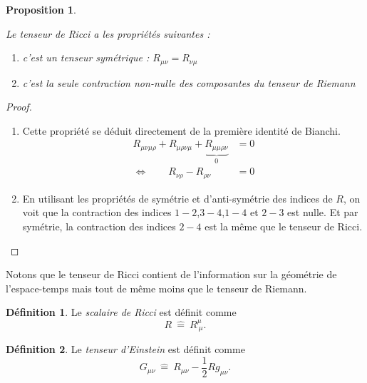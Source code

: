 \documentclass[a4paper,11pt]{report}
\theoremstyle{definition}
\theoremstyle{plain}
\newtheorem{prop}[thm]{Proposition}
\theoremstyle{definition}
\newtheorem{defn}{Définition}[chapter]
\theoremstyle{remark}
\begin{document}
        \begin{prop}\begin{leftbar}
            Le tenseur de Ricci a les propriétés suivantes :
            \begin{enumerate}[label = \textit{\roman*)}]
                \item c'est un tenseur symétrique : $R_{\mu\nu} = R_{\nu\mu}$
                \item c'est la seule contraction non-nulle des composantes du tenseur de Riemann
            \end{enumerate}
        \end{leftbar}\end{prop}
        
        \begin{proof}${}$
            \begin{enumerate}[label = \textit{\roman*)}]
                \item Cette propriété se déduit directement de la première identité de Bianchi.
                \begin{align}
                    R_{\mu\nu\mu\rho}+R_{\mu\rho\nu\mu}+\underbrace{R_{\mu\mu\rho\nu}}_{0} &= 0\\
                    \Leftrightarrow\qquad R_{\nu\rho} - R_{\rho\nu} &= 0
                \end{align}
                \item En utilisant les propriétés de symétrie et d'anti-symétrie des indices de $R$, on voit que la contraction des indices $1-2$,$3-4$,$1-4$ et $2-3$ est nulle. Et par symétrie, la contraction des indices $2-4$ est la même que le tenseur de Ricci.
            \end{enumerate}
        \end{proof}
        
        Notons que le tenseur de Ricci contient de l'information sur la géométrie de l'espace-temps mais tout de même moins que le tenseur de Riemann.
        
         \begin{defn}
            Le \textit{scalaire de Ricci} est définit comme
            \begin{equation}
                R ~\hat{=}~ R^\mu_{~\mu}.
            \end{equation}
        \end{defn}
        
        \begin{defn}
            Le \textit{tenseur d'Einstein} est définit comme
            \begin{equation}
                G_{\mu\nu} ~\hat{=}~ R_{\mu\nu}-\frac{1}{2}Rg_{\mu\nu}.
            \end{equation}
        \end{defn}
        
\end{document}
